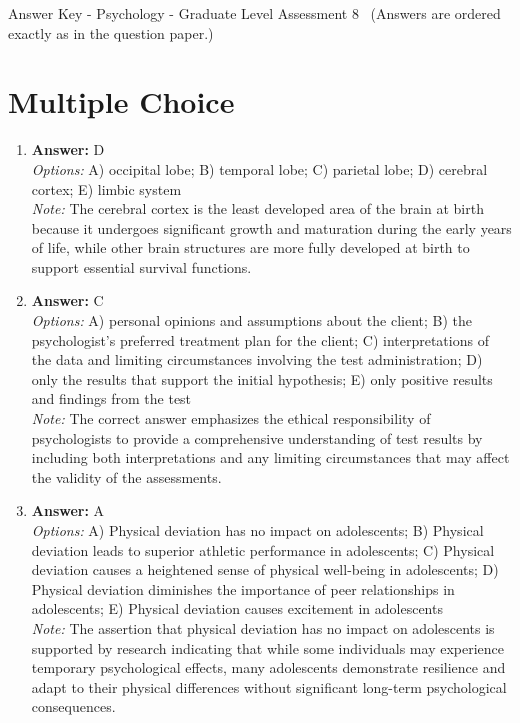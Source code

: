 \documentclass[12pt]{article}
\begin{document}
\begin{center}
Answer Key - Psychology - Graduate Level Assessment 8 \
\small (Answers are ordered exactly as in the question paper.)
\end{center}

\section*{Multiple Choice}
\begin{enumerate}[label=\arabic*.]
\item \textbf{Answer:} D
\\ \textit{Options:} A) occipital lobe; B) temporal lobe; C) parietal lobe; D) cerebral cortex; E) limbic system
\\ \textit{Note:} The cerebral cortex is the least developed area of the brain at birth because it undergoes significant growth and maturation during the early years of life, while other brain structures are more fully developed at birth to support essential survival functions.
\item \textbf{Answer:} C
\\ \textit{Options:} A) personal opinions and assumptions about the client; B) the psychologist's preferred treatment plan for the client; C) interpretations of the data and limiting circumstances involving the test administration; D) only the results that support the initial hypothesis; E) only positive results and findings from the test
\\ \textit{Note:} The correct answer emphasizes the ethical responsibility of psychologists to provide a comprehensive understanding of test results by including both interpretations and any limiting circumstances that may affect the validity of the assessments.
\item \textbf{Answer:} A
\\ \textit{Options:} A) Physical deviation has no impact on adolescents; B) Physical deviation leads to superior athletic performance in adolescents; C) Physical deviation causes a heightened sense of physical well-being in adolescents; D) Physical deviation diminishes the importance of peer relationships in adolescents; E) Physical deviation causes excitement in adolescents
\\ \textit{Note:} The assertion that physical deviation has no impact on adolescents is supported by research indicating that while some individuals may experience temporary psychological effects, many adolescents demonstrate resilience and adapt to their physical differences without significant long-term psychological consequences.

\end{enumerate}
\end{document}

